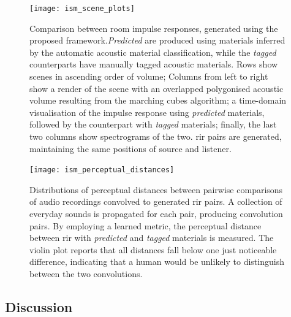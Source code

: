 \begin{figure}[htbp]
    \centering
    \texttt{[image: ism\_scene\_plots]}
    \caption{Comparison between room impulse responses, generated using the proposed framework.\emph{Predicted}  are produced using materials inferred by the automatic acoustic material classification, while the \emph{tagged} counterparts have manually tagged acoustic materials. Rows show scenes in ascending order of volume; Columns from left to right show a render of the scene with an overlapped polygonised acoustic volume resulting from the marching cubes algorithm; a time-domain visualisation of the impulse response using \emph{predicted} materials, followed by the counterpart with \emph{tagged} materials; finally, the last two columns show spectrograms of the two. \acrshort{rir} pairs are generated, maintaining the same positions of source and listener.}
    \label{fig:ism_scene_plots}
\end{figure}

\begin{figure}[htbp]
 \centering %
 \texttt{[image: ism\_perceptual\_distances]}
 \caption{Distributions of perceptual distances between pairwise comparisons of audio recordings convolved to generated \acrshort{rir} pairs.
A collection of everyday sounds is propagated for each pair, producing convolution pairs. By employing a learned metric, the perceptual distance between \acrshort{rir} with \emph{predicted} and \emph{tagged} materials is measured. The violin plot reports that all distances fall below one just noticeable difference, indicating that a human would be unlikely to distinguish between the two convolutions.}
 \label{fig:ism_perceptual_evaluation}
\end{figure}

\subsection{Discussion}

